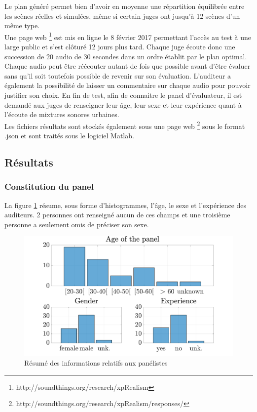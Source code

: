 Le plan généré permet bien d'avoir en moyenne une répartition équilibrée entre les scènes réelles et simulées, même si certain juges ont jusqu'à 12 scènes d'un même type.\\

Une page web \footnote{http://soundthings.org/research/xpRealism} est mis en ligne le 8 février 2017 permettant l'accès au test à une large public et s'est clôturé 12 jours plus tard. Chaque juge écoute donc une succession de 20 audio de 30 secondes dans un ordre établit par le plan optimal. Chaque audio peut être réécouter autant de fois que possible avant d'être évaluer sans qu'il soit toutefois possible de revenir sur son évaluation. L'auditeur a également la possibilité de laisser un commentaire sur chaque audio pour pouvoir justifier son choix. En fin de test, afin de connaitre le panel d'évaluateur, il est demandé aux juges de renseigner leur âge, leur sexe et leur expérience quant à l'écoute de mixtures sonores urbaines.\\

Les fichiers résultats sont stockés également sous une page web \footnote{http://soundthings.org/research/xpRealism/responses/} sous le format .json et sont traités sous le logiciel Matlab.\\

\subsection{Résultats}
\subsubsection{Constitution du panel}

La figure \ref{fig:panelTest} résume, sous forme d'histogrammes, l'âge, le sexe et l'expérience des auditeurs. 2 personnes ont renseigné aucun de ces champs et une troisième personne a seulement omis de préciser son sexe.\\

\begin{figure}[ht]
\centering
\includegraphics[width = .8\textwidth]{./figures/test_perceptif/testPerceptif_panel.pdf}
\caption{Résumé des informations relatifs aux panélistes}
\label{fig:panelTest}
\end{figure}

